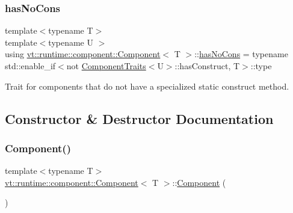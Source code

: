 \subsubsection{\texorpdfstring{has\+No\+Cons}{hasNoCons}}
{\footnotesize\ttfamily template$<$typename T$>$ \\
template$<$typename U $>$ \\
using \hyperlink{structvt_1_1runtime_1_1component_1_1_component}{vt\+::runtime\+::component\+::\+Component}$<$ T $>$\+::\hyperlink{structvt_1_1runtime_1_1component_1_1_component_a389e53dbfc20013d66ef09d4f42c0a53}{has\+No\+Cons} =  typename std\+::enable\+\_\+if$<$not \hyperlink{structvt_1_1runtime_1_1component_1_1_component_traits}{Component\+Traits}$<$U$>$\+::has\+Construct, T$>$\+::type}



Trait for components that do not have a specialized static construct method. 



\subsection{Constructor \& Destructor Documentation}
\mbox{\label{structvt_1_1runtime_1_1component_1_1_component_ab954824329584814bb652ea810cd62e3}} 
\subsubsection{\texorpdfstring{Component()}{Component()}\hspace{0.1cm}{\footnotesize\ttfamily [1/2]}}
{\footnotesize\ttfamily template$<$typename T$>$ \\
\hyperlink{structvt_1_1runtime_1_1component_1_1_component}{vt\+::runtime\+::component\+::\+Component}$<$ T $>$\+::\hyperlink{structvt_1_1runtime_1_1component_1_1_component}{Component} (\begin{DoxyParamCaption}{ }\end{DoxyParamCaption})\hspace{0.3cm}{\ttfamily [default]}}

\mbox{\label{structvt_1_1runtime_1_1component_1_1_component_a1a94c1d493860adff6ae69c5eb31bb3f}} 
